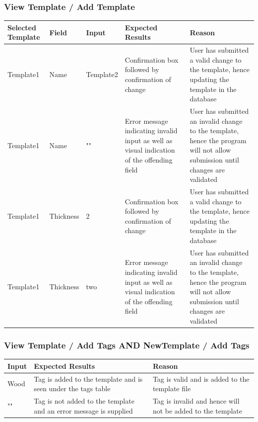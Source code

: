 \documentclass[oneside,openany,11pt,a4paper]{report}
\begin{document}
\subsubsection{View Template / Add Template}
\begin{longtable}{|p{3cm}|p{3cm}|p{3cm}|p{3cm}|p{3cm}|}
	\hline
	\rowcolor{gray!50}
	\textbf{Selected Template} & \textbf{Field} & \textbf{Input} & \textbf{Expected Results} & \textbf{Reason}\\ \hline
	
	Template1 & Name & Template2 & Confirmation box followed by confirmation of change & User has submitted a valid change to the template, hence updating the template in the database \\ \hline
	
	Template1 & Name & "" & Error message indicating invalid input as well as visual indication of the offending field & User has submitted an invalid change to the template, hence the program will not allow submission until changes are validated \\ \hline
	
	Template1  & Thickness & 2 & Confirmation box followed by confirmation of change & User has submitted a valid change to the template, hence updating the template in the database \\ \hline
	
	Template1 & Thickness & two &Error message indicating invalid input as well as visual indication of the offending field & User has submitted an invalid change to the template, hence the program will not allow submission until changes are validated \\ \hline
\end{longtable}


\subsubsection{View Template / Add Tags  AND NewTemplate / Add Tags}
\begin{longtable}{|p{3cm}|p{6cm}|p{6cm}|}
	\hline
	\rowcolor{gray!50}
	\textbf{Input} &  \textbf{Expected Results} & \textbf{Reason} \\ \hline
	
	Wood & Tag is added to the template and is seen under the tags table & Tag is valid and is added to the template file \\ \hline
	
	"" & Tag is not added to the template and an error message is supplied & Tag is invalid and hence will not be added to the template \\ \hline
\end{longtable}
\pagebreak
\end{document}
